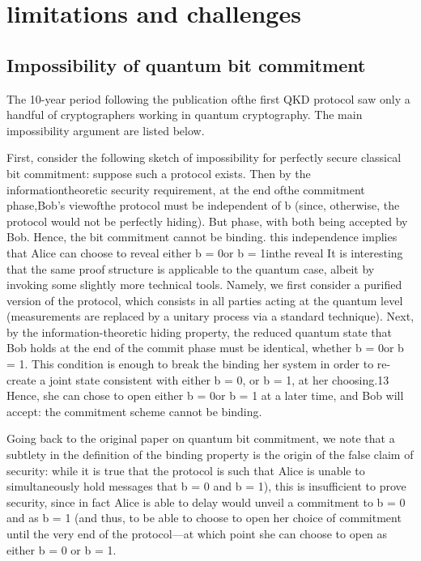 \chapter{limitations and challenges}
\label{chap:limitations and challenges}

\section{Impossibility of quantum bit commitment}

The 10-year period following the publication ofthe first QKD protocol \cite{Bennett2014} saw only a handful of cryptographers working in quantum cryptography. The main impossibility argument are listed below.

First, consider the following sketch of impossibility for perfectly secure classical bit commitment: suppose such a protocol exists. Then by the informationtheoretic security requirement, at the end ofthe commitment phase,Bob’s viewofthe protocol must be independent of b (since, otherwise, the protocol would not be perfectly hiding). But phase, with both being accepted by Bob. Hence, the bit commitment cannot be binding. this independence implies that Alice can choose to reveal either b = 0or b = 1inthe reveal It is interesting that the same proof structure is applicable to the quantum case, albeit by invoking some slightly more technical tools. Namely, we first consider a purified version of the protocol, which consists in all parties acting at the quantum level (measurements are replaced by a unitary process via a standard technique). Next, by the information-theoretic hiding property, the reduced quantum state that Bob holds at the end of the commit phase must be identical, whether b = 0or b = 1. This condition is enough to break the binding her system in order to re-create a joint state consistent with either b = 0, or b = 1, at her choosing.13 Hence, she can chose to open either b = 0or b = 1 at a later time, and Bob will accept: the commitment scheme cannot be binding.

Going back to the original paper on quantum bit commitment, we note that a subtlety in the definition of the binding property is the origin of the false claim of security: while it is true that the protocol is such that Alice is unable to simultaneously hold messages that b = 0 and b = 1), this is insufficient to prove security, since in fact Alice is able to delay would unveil a commitment to b = 0 and as b = 1 (and thus, to be able to choose to open her choice of commitment until the very end of the protocol—at which point she can choose to open as either b = 0 or b = 1.




